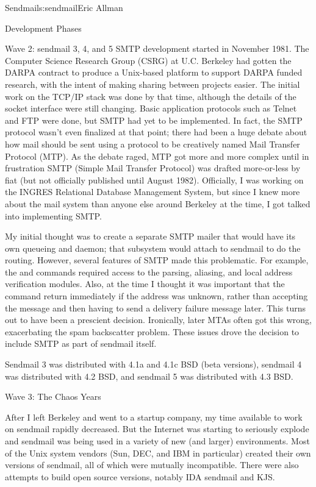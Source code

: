 \begin{aosachapter}{Sendmail}{s:sendmail}{Eric Allman}
\begin{aosasect1}{Development Phases}
\begin{aosasect2}{Wave 2: sendmail 3, 4, and 5}
SMTP development started in November 1981.
The Computer Science Research Group (CSRG) at U.C. Berkeley had gotten
the DARPA contract to produce a Unix-based platform to support DARPA
funded research, with the intent of making sharing between projects
easier.  The initial work on the TCP/IP stack was done by that time,
although the details of the socket interface were still changing.
Basic application protocols such as Telnet and FTP were done, but SMTP
had yet to be implemented. In fact, the SMTP protocol wasn't even
finalized at that point; there had been a huge debate about how mail
should be sent using a protocol to be creatively named Mail Transfer
Protocol (MTP). As the debate raged, MTP got more and more complex
until in frustration SMTP (Simple Mail Transfer Protocol) was drafted
more-or-less by fiat (but not officially published until August 1982).
Officially, I was working on the INGRES Relational Database Management
System, but since I knew more about the mail system than anyone else
around Berkeley at the time, I got talked into implementing SMTP.

My initial thought was to create a separate SMTP mailer that would
have its own queueing and daemon; that subsystem would attach to
sendmail to do the routing. However, several features of SMTP made
this problematic. For example, the  and  commands required
access to the parsing, aliasing, and local address verification
modules. Also, at the time I thought it was important that the 
command return immediately if the address was unknown, rather than
accepting the message and then having to send a delivery failure
message later. This turns out to have been a prescient
decision. Ironically, later MTAs often got this wrong, exacerbating
the spam backscatter problem. These issues drove the decision to
include SMTP as part of sendmail itself.

Sendmail 3 was distributed with 4.1a and 4.1c BSD (beta versions),
sendmail 4 was distributed with 4.2 BSD, and sendmail 5 was
distributed with 4.3 BSD.

\end{aosasect2}

\begin{aosasect2}{Wave 3: The Chaos Years}

After I left Berkeley and went to a startup company, my time available
to work on sendmail rapidly decreased. But the Internet was starting
to seriously explode and sendmail was being used in a variety of new
(and larger) environments. Most of the Unix system vendors (Sun, DEC,
and IBM in particular) created their own versions of sendmail, all of
which were mutually incompatible. There were also attempts to build
open source versions, notably IDA sendmail and KJS.


\end{aosasect2}
\end{aosasect1}
\end{aosachapter}
